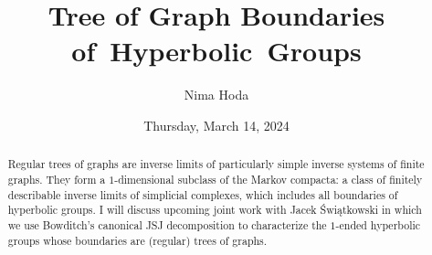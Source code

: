\documentclass{UAmathtalk}
\author{Nima Hoda}
\title{Tree of Graph Boundaries of~Hyperbolic~Groups}
\date{Thursday, March 14, 2024}
\begin{document}
\maketitle

\begin{abstract}
Regular trees of graphs are inverse limits of particularly simple inverse systems of finite graphs.  They form a $1$-dimensional subclass of the Markov compacta: a class of finitely describable inverse limits of simplicial complexes, which includes all boundaries of hyperbolic groups.  I will discuss upcoming joint work with Jacek Świątkowski in which we use Bowditch’s canonical JSJ decomposition to characterize the $1$-ended hyperbolic groups whose boundaries are (regular) trees of graphs.
\end{abstract}
\end{document}
